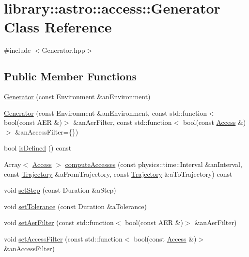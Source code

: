 \hypertarget{classlibrary_1_1astro_1_1access_1_1_generator}{}\section{library\+:\+:astro\+:\+:access\+:\+:Generator Class Reference}
\label{classlibrary_1_1astro_1_1access_1_1_generator}


{\ttfamily \#include $<$Generator.\+hpp$>$}

\subsection*{Public Member Functions}
\begin{DoxyCompactItemize}
\item 
\hyperlink{classlibrary_1_1astro_1_1access_1_1_generator_a7b07719b1622bb4ffb7fe0d654f91fea}{Generator} (const Environment \&an\+Environment)
\item 
\hyperlink{classlibrary_1_1astro_1_1access_1_1_generator_af97f7c62f7853dfda210de3012783dd1}{Generator} (const Environment \&an\+Environment, const std\+::function$<$ bool(const A\+ER \&)$>$ \&an\+Aer\+Filter, const std\+::function$<$ bool(const \hyperlink{classlibrary_1_1astro_1_1_access}{Access} \&)$>$ \&an\+Access\+Filter=\{\})
\item 
bool \hyperlink{classlibrary_1_1astro_1_1access_1_1_generator_aa7d19995a53368779ed55c254bb9b64f}{is\+Defined} () const
\item 
Array$<$ \hyperlink{classlibrary_1_1astro_1_1_access}{Access} $>$ \hyperlink{classlibrary_1_1astro_1_1access_1_1_generator_ab6e35507090c7ce4367266f2d76c9178}{compute\+Accesses} (const physics\+::time\+::\+Interval \&an\+Interval, const \hyperlink{classlibrary_1_1astro_1_1_trajectory}{Trajectory} \&a\+From\+Trajectory, const \hyperlink{classlibrary_1_1astro_1_1_trajectory}{Trajectory} \&a\+To\+Trajectory) const
\item 
void \hyperlink{classlibrary_1_1astro_1_1access_1_1_generator_ac5325bb33fb0cb6fc3e556a5a4eb0934}{set\+Step} (const Duration \&a\+Step)
\item 
void \hyperlink{classlibrary_1_1astro_1_1access_1_1_generator_ae4bc02fcd2edd6235745409996cd5bb6}{set\+Tolerance} (const Duration \&a\+Tolerance)
\item 
void \hyperlink{classlibrary_1_1astro_1_1access_1_1_generator_a2676ec52653573cf1ff91876f671a679}{set\+Aer\+Filter} (const std\+::function$<$ bool(const A\+ER \&)$>$ \&an\+Aer\+Filter)
\item 
void \hyperlink{classlibrary_1_1astro_1_1access_1_1_generator_a74992fd0314e87ffd4b47a2c7f20c646}{set\+Access\+Filter} (const std\+::function$<$ bool(const \hyperlink{classlibrary_1_1astro_1_1_access}{Access} \&)$>$ \&an\+Access\+Filter)
\end{DoxyCompactItemize}
